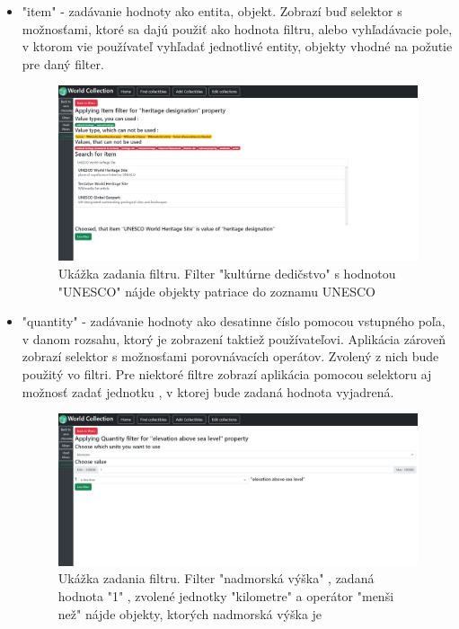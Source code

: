 \begin{itemize}
      \item "item" - zadávanie hodnoty ako entita, objekt. Zobrazí buď selektor s možnosťami, ktoré sa dajú použiť ako hodnota filtru, alebo vyhľadávacie pole, v ktorom vie používateľ vyhľadať jednotlivé entity, objekty vhodné na požutie pre daný filter.
            \begin{figure}[h]
                  \includegraphics[width=140mm]{../img/ud-item-filter.png}
                  \centering
                  \caption{Ukážka zadania filtru.  Filter "kultúrne dedičstvo" s hodnotou "UNESCO" nájde objekty patriace do zoznamu UNESCO}
            \end{figure}
      \item "quantity" - zadávanie hodnoty ako desatinne číslo pomocou vstupného poľa, v danom rozsahu, ktorý je zobrazení taktiež používateľovi.
            Aplikácia zároveň zobrazí selektor s možnosťami porovnávacích operátov. Zvolený z nich bude použitý vo filtri.
            Pre niektoré filtre zobrazí aplikácia pomocou selektoru aj možnosť zadať jednotku , v ktorej bude zadaná hodnota vyjadrená.
            \begin{figure}[h]
                  \includegraphics[width=140mm]{../img/ud-quantity-filter.png}
                  \centering
                  \caption{Ukážka zadania filtru. Filter "nadmorská výška" , zadaná hodnota "1" , zvolené jednotky "kilometre" a operátor "menši než" nájde objekty, ktorých nadmorská výška je
}
\end{figure}
\end{itemize}
